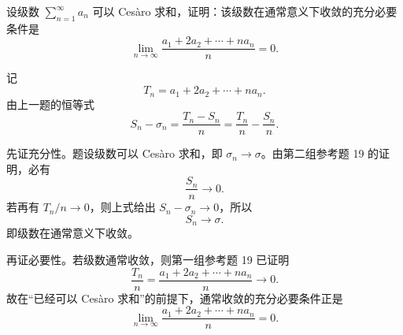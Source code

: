 \begin{xreferenceproblem}[22]
设级数 $\sum_{n=1}^{\infty}a_n$ 可以 Cesàro 求和，证明：该级数在通常意义下收敛的充分必要条件是
\[
\lim_{n\to\infty}\frac{a_1+2a_2+\cdots+na_n}{n}=0.
\]
\end{xreferenceproblem}
\begin{xsolution}
记
\[
 T_n=a_1+2a_2+\cdots+na_n.
\]
由上一题的恒等式
\[
 S_n-\sigma_n=\frac{T_n-S_n}{n}
 =\frac{T_n}{n}-\frac{S_n}{n}.
\]

先证充分性。题设级数可以 Cesàro 求和，即 $\sigma_n\to\sigma$。由第二组参考题 19 的证明，必有
\[
 \frac{S_n}{n}\to0.
\]
若再有 $T_n/n\to0$，则上式给出 $S_n-\sigma_n\to0$，所以
\[
 S_n\to\sigma.
\]
即级数在通常意义下收敛。

再证必要性。若级数通常收敛，则第一组参考题 19 已证明
\[
 \frac{T_n}{n}
 =\frac{a_1+2a_2+\cdots+na_n}{n}\longrightarrow0.
\]
故在“已经可以 Cesàro 求和”的前提下，通常收敛的充分必要条件正是
\[
 \boxed{\lim_{n\to\infty}\frac{a_1+2a_2+\cdots+na_n}{n}=0}.
\]
\end{xsolution}

